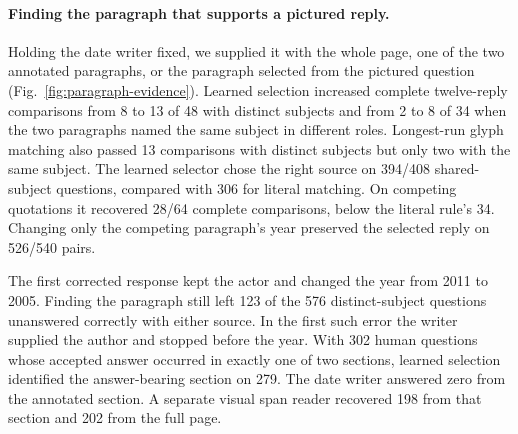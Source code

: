 \paragraph{Finding the paragraph that supports a pictured reply.}
Holding the date writer fixed, we supplied it with the whole page, one of the two annotated paragraphs, or the paragraph selected from the pictured question (Fig.~\ref{fig:paragraph-evidence}). Learned selection increased complete twelve-reply comparisons from 8 to 13 of 48 with distinct subjects and from 2 to 8 of 34 when the two paragraphs named the same subject in different roles. Longest-run glyph matching also passed 13 comparisons with distinct subjects but only two with the same subject. The learned selector chose the right source on 394/408 shared-subject questions, compared with 306 for literal matching. On competing quotations it recovered 28/64 complete comparisons, below the literal rule's 34. Changing only the competing paragraph's year preserved the selected reply on 526/540 pairs.

The first corrected response kept the actor and changed the year from 2011 to 2005. Finding the paragraph still left 123 of the 576 distinct-subject questions unanswered correctly with either source. In the first such error the writer supplied the author and stopped before the year. With 302 human questions whose accepted answer occurred in exactly one of two sections, learned selection identified the answer-bearing section on 279. The date writer answered zero from the annotated section. A separate visual span reader recovered 198 from that section and 202 from the full page.
